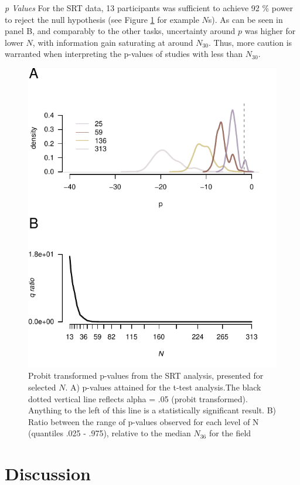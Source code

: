 \documentclass{article}
\begin{document}
\emph{p Values} For the SRT data, 13 participants was sufficient to achieve 92 \% power to reject the null hypothesis (see Figure \ref{fig:SRTps} for example \(N\)s). As can be seen in panel B, and comparably to the other tasks, uncertainty around \(p\) was higher for lower \(N\), with information gain saturating at around \(N_{30}\). Thus, more caution is warranted when interpreting the p-values of studies with less than \(N_{30}\).

\begin{figure}

{\centering \includegraphics[width=0.4\linewidth]{../images/IMMSRT_ps} 

}

\caption{Probit transformed p-values from the SRT analysis, presented for selected $N$. A) p-values attained for the t-test analysis.The black dotted vertical line reflects alpha = .05 (probit transformed). Anything to the left of this line is a statistically significant result. B) Ratio between the range of p-values observed for each level of N (quantiles .025 - .975), relative to the median $N_{36}$ for the field}\label{fig:SRTps}
\end{figure}

\hypertarget{discussion}{%
\section{Discussion}\label{discussion}}

\label{sec:Discussion}
\end{document}
